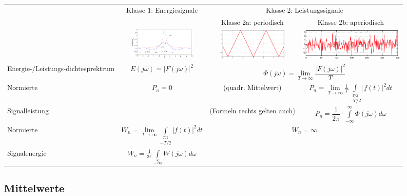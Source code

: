 			\begin{tabularx}{\textwidth}{|p{3.1cm}|c|c|c|}
			\hline
				{}
			&	\multirow{2}{*}{Klasse 1: Energiesignale}
			&	\multicolumn{2}{c|}{Klasse 2: Leistungssignale}
			\\ 
				{}
			&	
			&	Klasse 2a: periodisch
			&	Klasse 2b: aperiodisch
			\\ \hline 
				{}
			&	\includegraphics[width=3.3cm]{./bilder/sinc.png}
			& 	\includegraphics[width=3.5cm]{./bilder/dreieck.png}
			& 	\includegraphics[width=5.29cm]{./bilder/rauschen.png}
			\\ \hline 
				Energie-/Leistungs-dichtesprektrum
			& 	$ E(j \omega) = |F(j \omega)|^2 $
			& 	\multicolumn{2}{c|}{$ \Phi(j\omega) = \lim\limits_{T \to \infty} \dfrac{|F(j\omega)|^2}{T} $}
			\\ \hline 
				Normierte
			& 	$ P_n = 0$
			& 	\formel{$P_n = X^2$} (quadr. Mittelwert)
			& 	$ P_n = \lim\limits_{T \rightarrow \infty} \frac{1}{T} 
									\int\limits_{-T/2}\limits^{T/2} |f(t)|^2 dt $
			\\
				Signalleistung
			&
			& 	(Formeln rechts gelten auch)
			& 	$ P_n = \dfrac{1}{2\pi} \cdot \int\limits_{-\infty}^{\infty} \Phi(j\omega) d\omega $
			\\ \hline
				Normierte
			& 	$ W_n = \lim\limits_{T \rightarrow \infty} \int\limits_{-T/2}\limits^{T/2} |f(t)|^2 dt $
			&	\multicolumn{2}{c|}{$ W_n = \infty $}
			\\
				Signalenergie
			& 	$ W_n = \frac{1}{2 \pi} \int\limits_{-\infty}\limits^{\infty}
									W(j \omega) d\omega $
			&	\multicolumn{2}{c|}{}
			\\ \hline
			\end{tabularx}
		
		
	\subsection{Mittelwerte }
		
